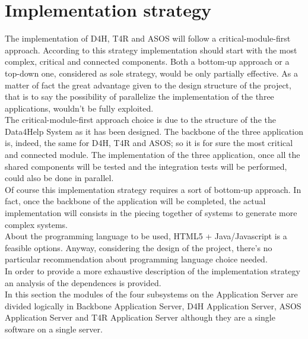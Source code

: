 
\section{Implementation strategy }

The implementation of D4H, T4R and ASOS will follow a critical-module-first approach. According to this strategy implementation should start with the most complex, critical and connected components. Both a bottom-up approach or a top-down one, considered as sole strategy, would be only partially effective. As a matter of fact the great advantage given to the design structure of the project, that is to say the possibility of parallelize the implementation of the three applications, wouldn't be fully exploited.\\ The critical-module-first approach choice is due to the structure of the the Data4Help System as it has been designed. The backbone of the three application is, indeed, the same for D4H, T4R and ASOS; so it is for sure the most critical and connected module. The implementation of the three application, once all the shared components will be tested and the integration tests will be performed, could also be done in parallel. \\ Of course this implementation strategy requires a sort of bottom-up approach. In fact, once the backbone of the application will be completed, the actual implementation will consists in the piecing together of systems to generate more complex systems. \\ About the programming language to be used, HTML5 + Java/Javascript is a feasible options. Anyway, considering the design of the project, there's no particular recommendation about programming language choice needed. \\ In order to provide a more exhaustive description of the implementation strategy an analysis of the dependences is provided. \\
In this section the modules of the four subsystems on the Application Server are divided logically in Backbone Application Server, D4H Application Server, ASOS Application Server and T4R Application Server although they are a single software on a single server.
